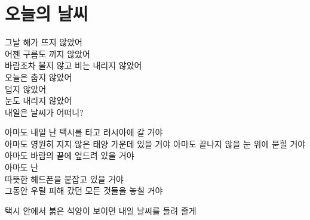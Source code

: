 \hypertarget{uxc624uxb298uxc758-uxb0a0uxc528}{%

\chapter{오늘의 날씨}\label{uxc624uxb298uxc758-uxb0a0uxc528}}



그날 해가 뜨지 않았어\\

어젠 구름도 끼지 않았어\\

바람조차 불지 않고 비는 내리지 않았어\\

오늘은 춥지 않았어\\

덥지 않았어\\

눈도 내리지 않았어\\

내일은 날씨가 어떠니?



아마도 내일 난 택시를 타고 러시아에 갈 거야\\

아마도 영원히 지지 않은 태양 가운데 있을 거야 아마도 끝나지 않을 눈 위에 묻힐 거야\\

아마도 바람의 끝에 엎드려 있을 거야\\

아마도 난\\

따뜻한 헤드폰을 붙잡고 있을 거야\\

그동안 우릴 피해 갔던 모든 것들을 놓칠 거야



택시 안에서 붉은 석양이 보이면 내일 날씨를 들려 줄게

